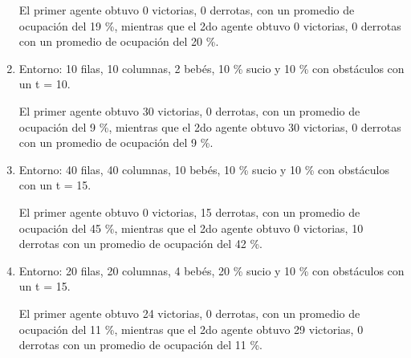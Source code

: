 \documentclass[a4paper,10pt,twocolumn]{article}
\begin{document}
\begin{enumerate}
		
		El primer agente obtuvo 0 victorias, 0 derrotas, con un promedio de ocupación del 19 \%, mientras que el 2do agente obtuvo 0 victorias, 0 derrotas con un promedio de ocupación del 20 \%.
		
		\item Entorno: 10 filas, 10 columnas, 2 bebés, 10 \% sucio y 10 \% con obstáculos con un t = 10. 
		
		
		El primer agente obtuvo 30 victorias, 0 derrotas, con un promedio de ocupación del 9 \%, mientras que el 2do agente obtuvo 30 victorias, 0 derrotas con un promedio de ocupación del 9 \%.
		
		\item Entorno: 40 filas, 40 columnas, 10 bebés, 10 \% sucio y 10 \% con obstáculos con un t = 15. 
		
		
		El primer agente obtuvo 0 victorias, 15 derrotas, con un promedio de ocupación del 45 \%, mientras que el 2do agente obtuvo 0 victorias, 10 derrotas con un promedio de ocupación del 42 \%.
		
		\item Entorno: 20 filas, 20 columnas, 4 bebés, 20 \% sucio y 10 \% con obstáculos con un t = 15. 
		
		
		El primer agente obtuvo 24 victorias, 0 derrotas, con un promedio de ocupación del 11 \%, mientras que el 2do agente obtuvo 29 victorias, 0 derrotas con un promedio de ocupación del 11 \%.
		
	\end{enumerate}





\label{end}
\end{document}
